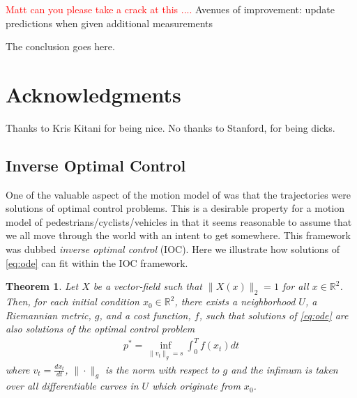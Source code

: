 \documentclass[letterpaper,10pt,conference]{ieeeconf}
\newtheorem{thm}{Theorem}
\newcommand{\Ram}[1]{\textcolor{red}{#1}}
\begin{document}
\Ram{Matt can you please take a crack at this ....}
Avenues of improvement:
update predictions when given additional measurements

The conclusion goes here.

\section*{Acknowledgments}
Thanks to Kris Kitani for being nice.  No thanks to Stanford, for being dicks.

\appendix
\subsection{Inverse Optimal Control} \label{app:ioc}
One of the valuable aspect of the motion model of \cite{Kitani2012} was that the trajectories were solutions of optimal control problems.
This is a desirable property for a motion model of pedestrians/cyclists/vehicles in that it seems reasonable to assume that we all move through the world with an intent to get somewhere.
This framework was dubbed \emph{inverse optimal control} (IOC).
Here we illustrate how solutions of \eqref{eq:ode} can fit within the IOC framework.

\begin{thm}
	Let $X$ be a vector-field such that $\| X(x) \|_2 = 1$ for all $x \in \mathbb{R}^2$.
Then, for each initial condition $x_0 \in \mathbb{R}^2$, there exists a neighborhood $U$, a Riemannian metric, $g$, and a cost function, $f$, 
such that solutions of \eqref{eq:ode} are also solutions of the optimal control problem
\begin{align}
	p^* = \inf_{ \| v_t \|_g = s } \int_0^T f( x_t) dt \label{eq:IOC}
\end{align}
where $v_t = \frac{d x_t}{dt}$, $\| \cdot \|_g$ is the norm with respect to $g$ and the infimum is taken over all differentiable curves in $U$ which originate from $x_0$.
\end{thm}
\end{document}
